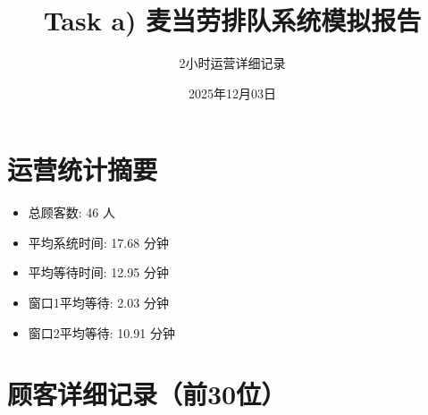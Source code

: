 \documentclass[12pt, a4paper]{article}
\begin{document}
\title{\textbf{Task a) 麦当劳排队系统模拟报告}}
\author{2小时运营详细记录}
\date{2025年12月03日}
\maketitle

\section{运营统计摘要}

\begin{itemize}
    \item 总顾客数: 46 人
    \item 平均系统时间: 17.68 分钟
    \item 平均等待时间: 12.95 分钟
    \item 窗口1平均等待: 2.03 分钟
    \item 窗口2平均等待: 10.91 分钟
\end{itemize}

\section{顾客详细记录（前30位）}
\end{document}
